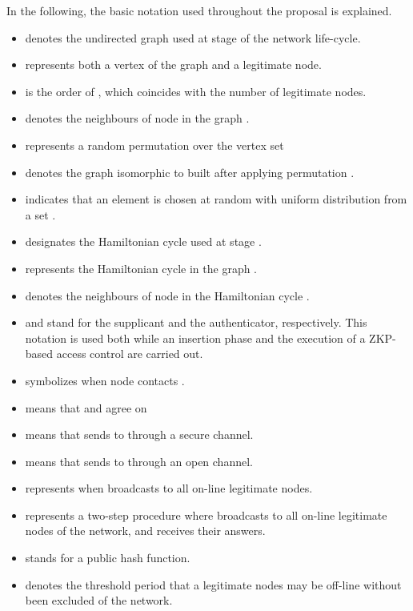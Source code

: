 \documentclass[conference]{IEEEtran}
\begin{document}
In the following, the basic notation used throughout the proposal is explained.

\begin{itemize}
\item  denotes the undirected graph used at stage  of the network
life-cycle.

\item   represents both a vertex of the graph and a legitimate node.

\item  is the order of , which coincides with the
number of legitimate nodes.

\item  denotes the neighbours of node  in the graph .

\item  represents a random permutation over the
vertex set 

\item  denotes the graph isomorphic to  built after applying permutation .

\item  indicates that an element  is chosen at random with uniform distribution from a set .

\item  designates the Hamiltonian cycle used at stage .

\item  represents the Hamiltonian cycle  in the graph
.

\item  denotes the neighbours of node  in the Hamiltonian
cycle .

\item  and  stand for the supplicant and the
authenticator, respectively. This notation is used both while an insertion phase and the
execution of a ZKP-based access control are carried out.

\item  symbolizes when node  contacts .

\item   means that  and  agree on 

\item   means that  sends 
to  through a secure channel.

\item   means that  sends 
to  through an open channel.

\item  represents when  broadcasts  to all on-line legitimate nodes.

\item  represents a two-step procedure where 
broadcasts  to all on-line legitimate nodes of the
network, and receives their answers.

\item  stands for a public hash function.

\item  denotes the
threshold period that a legitimate nodes may be off-line without been excluded of the network.

\end{itemize}
\end{document}
